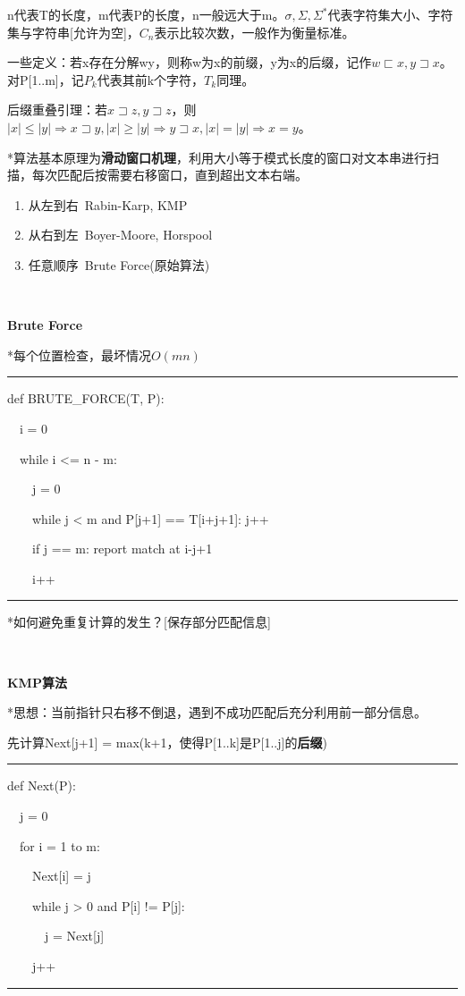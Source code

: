 \documentclass[a4paper,UTF8,fontset=windows]{ctexart}
\newenvironment{code}{\rule{36em}{0.1em}\setlength{\parindent}{1em}

}{

\setlength{\parindent}{0em}\rule{36em}{0.1em}}
\begin{document}
n代表T的长度，m代表P的长度，n一般远大于m。$\sigma,\Sigma,\Sigma^*$代表字符集大小、字符集与字符串[允许为空]，$C_n$表示比较次数，一般作为衡量标准。

一些定义：若x存在分解wy，则称w为x的前缀，y为x的后缀，记作$w\sqsubset x,y\sqsupset x$。对P[1..m]，记$P_k$代表其前k个字符，$T_k$同理。

后缀重叠引理：若$x\sqsupset z, y\sqsupset z$，则$|x|\le|y|\Rightarrow x\sqsupset y,|x|\ge|y|\Rightarrow y\sqsupset x,|x|=|y|\Rightarrow x = y$。

*\hspace{0em}算法基本原理为\textbf{滑动窗口机理}，利用大小等于模式长度的窗口对文本串进行扫描，每次匹配后按需要右移窗口，直到超出文本右端。

\begin{enumerate}
    \item 从左到右\ Rabin-Karp, KMP
    \item 从右到左\ Boyer-Moore, Horspool
    \item 任意顺序\ Brute Force(原始算法)
\end{enumerate}

\

\textbf{Brute Force}

*\hspace{0em}每个位置检查，最坏情况$O(mn)$

\begin{code}
def BRUTE\_FORCE(T, P):

\ \ i = 0

\ \ while i <= n - m:

\ \ \ \ j = 0

\ \ \ \ while j < m and P[j+1] == T[i+j+1]: j++

\ \ \ \ if j == m: report match at i-j+1

\ \ \ \ i++
\end{code}

*\hspace{0em}如何避免重复计算的发生？[保存部分匹配信息]

\

\textbf{KMP算法}

*\hspace{0em}思想：当前指针只右移不倒退，遇到不成功匹配后充分利用前一部分信息。

先计算Next[j+1] = max(k+1，使得P[1..k]是P[1..j]的\textbf{后缀})

\begin{code}
def Next(P):

\ \ j = 0

\ \ for i = 1 to m:

\ \ \ \ Next[i] = j

\ \ \ \ while j > 0 and P[i] != P[j]:

\ \ \ \ \ \ j = Next[j]

\ \ \ \ j++
\end{code}
\end{document}
